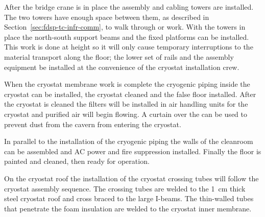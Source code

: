 After the bridge crane is %
in place the  assembly and cabling towers %
are installed. 
The two towers have enough space between them, as described in Section~\ref{sec:fdsp-tc-infr-comm}, to walk through or work. %
With the towers in place the north-south support beams and the fixed platforms can be installed. 
This work is done at height so it will only cause temporary interruptions to the material transport along the floor; 
the lower set of rails and the  assembly equipment be installed at the convenience of the cryostat installation crew.

When the cryostat membrane work is complete the cryogenic piping inside the cryostat can be installed, the cryostat cleaned and the false floor installed. After the cryostat is cleaned the filters will be installed in air handling units for the cryostat and purified air will begin flowing. A curtain over the  can be used to prevent dust from the cavern from entering the cryostat.

In parallel to the installation of the cryogenic piping the walls of the cleanroom can be assembled and AC power and fire suppression installed. Finally the floor is painted and %
cleaned, then %
ready for operation.



On the cryostat roof the installation of the cryostat crossing tubes will follow the cryostat assembly sequence.   
The crossing tubes are welded to the \SI{1}{cm} thick steel cryostat roof and cross braced to the large I-beams. 
The thin-walled tubes that penetrate the foam insulation are welded to the cryostat inner membrane.

